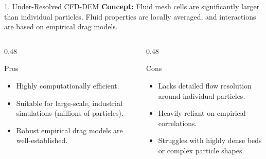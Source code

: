 \begin{frame}{1. Under-Resolved CFD-DEM}
    \textbf{Concept:} Fluid mesh cells are significantly larger than individual particles. Fluid properties are locally averaged, and interactions are based on empirical drag models.
    \vspace{0.3cm}
    
    \begin{columns}[T]
        \begin{column}{0.48\textwidth}
            \begin{block}{Pros}
                \begin{itemize}
                    \item Highly computationally efficient.
                    \item Suitable for large-scale, industrial simulations (millions of particles).
                    \item Robust empirical drag models are well-established.
                \end{itemize}
            \end{block}
        \end{column}
        
        \begin{column}{0.48\textwidth}
            \begin{alertblock}{Cons}
                \begin{itemize}
                    \item Lacks detailed flow resolution around individual particles.
                    \item Heavily reliant on empirical correlations.
                    \item Struggles with highly dense beds or complex particle shapes.
                \end{itemize}
            \end{alertblock}
        \end{column}
    \end{columns}
\end{frame}


